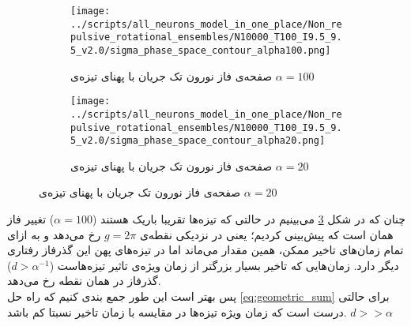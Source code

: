 \begin{figure}[h]
	\begin{subfigure}[b]{0.5\textwidth}
		\centering
		\texttt{[image: ../scripts/all\_neurons\_model\_in\_one\_place/Non\_repulsive\_rotational\_ensembles/N10000\_T100\_I9.5\_9.5\_v2.0/sigma\_phase\_space\_contour\_alpha100.png]}
		\caption{صفحه‌ی فاز نورون تک جریان با پهنای تیزه‌ی 
				$\alpha = 100$}
		\label{fig:non_repulsive_single_input_sigma_phase_space_alpha100}
	\end{subfigure}
	\hfill
	\begin{subfigure}[b]{0.5\textwidth}
		\centering
		\texttt{[image: ../scripts/all\_neurons\_model\_in\_one\_place/Non\_repulsive\_rotational\_ensembles/N10000\_T100\_I9.5\_9.5\_v2.0/sigma\_phase\_space\_contour\_alpha20.png]}
		\caption{صفحه‌ی فاز نورون تک جریان با پهنای تیزه‌ی 
		$\alpha = 20$}
		\label{fig:non_repulsive_single_input_sigma_phase_space_alpha20}
	\end{subfigure}
	\label{fig:non_repulsive_single_input_sigma_phase_space}
\end{figure}

چنان که در شکل \ref{fig:non_repulsive_single_input_sigma_phase_space} می‌بینیم در حالتی که تیزه‌ها تقریبا باریک هستند ($\alpha = 100$) تغییر فاز همان است که پیش‌بینی کردیم؛ یعنی در نزدیکی نقطه‌ی 
$g = 2\pi$
رخ می‌دهد و به ازای تمام زمان‌های تاخیر ممکن، همین مقدار می‌ماند اما در تیزه‌های پهن این گذرفاز رفتاری دیگر دارد. زمان‌هایی که تاخیر بسیار بزرگتر از زمان ویژه‌ی تاثیر تیزه‌هاست
($d > \alpha^{-1}$)
گذرفاز در همان نقطه رخ می‌دهد.\\

پس بهتر است این طور جمع بندی‌ کنیم که راه حل
\ref{eq:geometric_sum}
برای حالتی درست است که زمان ویژه تیزه‌ها در مقایسه با زمان تاخیر نسبتا کم باشد.
$d >> \alpha$


